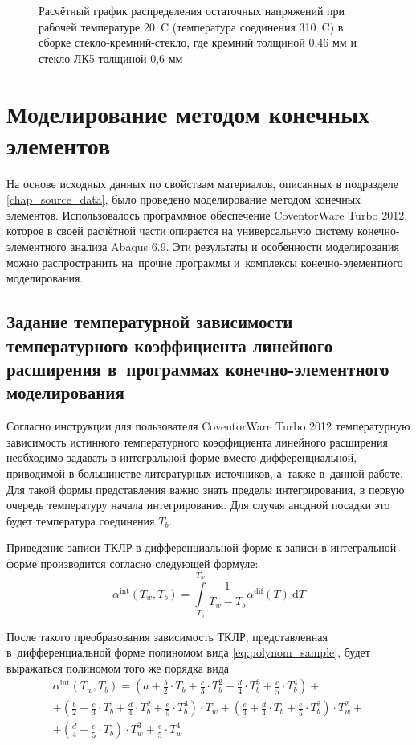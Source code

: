 \begin{figure}[!htb]
    \caption{Расчётный график распределения остаточных напряжений при рабочей температуре 20~{\textdegree}C (температура соединения 310~{\textdegree}C) в сборке стекло-кремний-стекло, где кремний толщиной 0,46 мм и стекло ЛК5 толщиной 0,6 мм}
    \label{fig:sigma_z_gsg_lk5}
\end{figure}

\section{Моделирование методом конечных элементов}
На основе исходных данных по свойствам материалов, описанных
в подразделе \ref{chap_source_data}, было проведено моделирование
методом конечных элементов. Использовалось программное обеспечение
CoventorWare Turbo 2012, которое в своей расчётной части опирается
на универсальную систему конечно-элементного анализа Abaqus 6.9.
Эти результаты и особенности моделирования можно распространить
на~прочие программы и~комплексы конечно-элементного моделирования.

\subsection{Задание температурной зависимости температурного коэффициента линейного расширения в~программах конечно-элементного моделирования}

Согласно инструкции для пользователя CoventorWare Turbo 2012 температурную
зависимость истинного температурного
коэффициента линейного расширения необходимо задавать в интегральной форме
вместо дифференциальной, приводимой в большинстве литературных источников,
а~также в~данной работе. Для такой формы представления важно знать пределы
интегрирования, в первую очередь температуру начала интегрирования. Для случая
анодной посадки это будет температура соединения \(T_b\).

Приведение записи ТКЛР в дифференциальной форме к записи в интегральной форме
производится согласно следующей формуле:
\begin{equation}
    \alpha^\mathrm{int}(T_w, T_b) =
    \int\limits_{T_b}^{T_w}
    \frac{1}{T_w-T_b}
    \alpha^\mathrm{dif}(T)\:\mathrm{d}T
\end{equation}

После такого преобразования зависимость ТКЛР, представленная
в~дифференциальной форме полиномом вида \eqref{eq:polynom_sample}, будет
выражаться полиномом того же порядка вида
\begin{multline}
    \alpha^\mathrm{int}(T_w, T_b) =
    \left(a + \frac{b}{2} \cdot T_b + \frac{c}{3} \cdot T_b^2 + \frac{d}{4} \cdot T_b^3 + \frac{e}{5} \cdot T_b^4\right)
    + \\ +
    \left(\frac{b}{2} + \frac{c}{3} \cdot T_b + \frac{d}{4} \cdot T_b^2 + \frac{e}{5} \cdot T_b^3\right) \cdot T_w
    + %
    \left(\frac{c}{3}+\frac{d}{4} \cdot T_b + \frac{e}{5} \cdot T_b^2\right) \cdot T_w^2
    + \\ +
    \left(\frac{d}{4} + \frac{e}{5} \cdot T_b\right) \cdot T_w^3 +
    \frac{e}{5} \cdot T_w^4
\end{multline}


